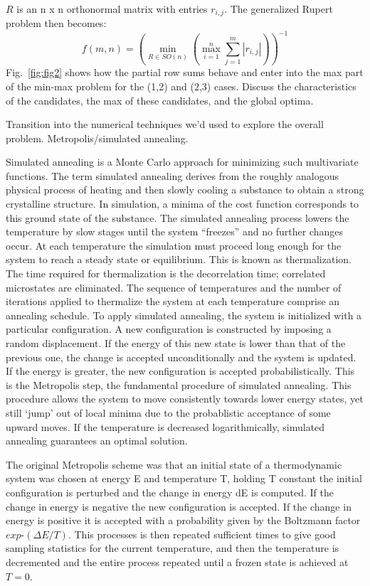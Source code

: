 \documentclass[superscriptaddress,reprint,amsmath,amssymb,aps]{revtex4-1}
\begin{document}
$R$ is an n x n orthonormal matrix with entries $r_{i,j}$. The generalized
Rupert problem then becomes:
\begin{equation*}
f(m,n) = \left(
           \min_{R \in SO(n)} \left(
             \max_{i=1}^{n} \sum_{j=1}^{m} |r_{i,j}|
           \right)
         \right)^{-1}
\end{equation*}
Fig.~\ref{fig:fig2} shows how the partial row sums behave and enter into
the max part of the min-max problem for the (1,2) and (2,3) cases.  Discuss
the characteristics of the candidates, the max of these candidates, and the
global optima.

Transition into the numerical techniques we'd used to
explore the overall problem.  Metropolis/simulated annealing.

\vspace{.15in}

Simulated annealing is a Monte Carlo approach for minimizing such
multivariate functions. The term simulated annealing derives from the
roughly analogous physical process of heating and then slowly cooling a
substance to obtain a strong crystalline structure. In simulation, a minima
of the cost function corresponds to this ground state of the substance. The
simulated annealing process lowers the temperature by slow stages until the
system ``freezes'' and no further changes occur. At each temperature the
simulation must proceed long enough for the system to reach a steady state
or equilibrium. This is known as thermalization. The time required for
thermalization is the decorrelation time; correlated microstates are
eliminated. The sequence of temperatures and the number of iterations
applied to thermalize the system at each temperature comprise an annealing
schedule.  To apply simulated annealing, the system is initialized with a
particular configuration. A new configuration is constructed by imposing a
random displacement. If the energy of this new state is lower than that of
the previous one, the change is accepted unconditionally and the system is
updated. If the energy is greater, the new configuration is accepted
probabilistically. This is the Metropolis step, the fundamental procedure
of simulated annealing. This procedure allows the system to move
consistently towards lower energy states, yet still ‘jump’ out of local
minima due to the probablistic acceptance of some upward moves. If the
temperature is decreased logarithmically, simulated annealing guarantees an
optimal solution.

The original Metropolis scheme was that an initial state of a thermodynamic
system was chosen at energy E and temperature T, holding T constant the
initial configuration is perturbed and the change in energy dE is computed.
If the change in energy is negative the new configuration is accepted. If
the change in energy is positive it is accepted with a probability given by
the Boltzmann factor $exp ‐(\Delta E/T)$.  This processes is then repeated
sufficient times to give good sampling statistics for the current
temperature, and then the temperature is decremented and the entire process
repeated until a frozen state is achieved at $T=0$.
\end{document}
